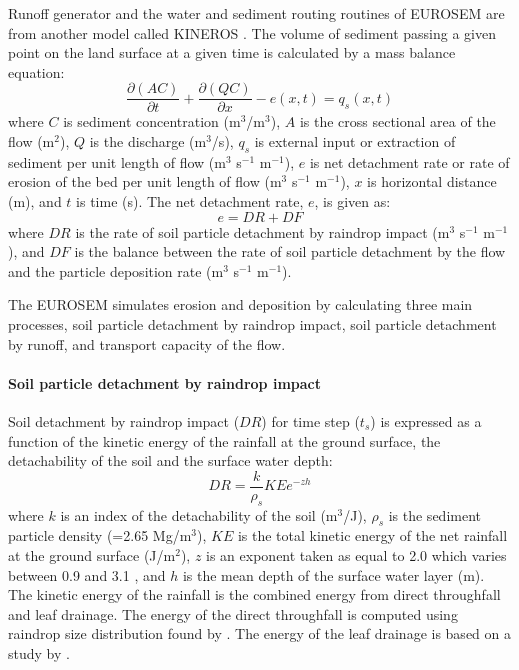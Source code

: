 Runoff generator and the water and sediment routing routines of EUROSEM are from
another model called KINEROS \citep{woolhiser1990-kineros}. The volume of
sediment passing a given point on the land surface at a given time is calculated
by a mass balance equation:
\begin{equation}
\label{eq:eurosemmassbalance}
  \frac{\partial(AC)}{\partial t}+\frac{\partial(QC)}{\partial x}-e(x,t)=
q_s(x,t)
\end{equation}
where $C$ is sediment concentration (m$^3$/m$^3$), $A$ is the cross sectional
area of the flow (m$^2$), $Q$ is the discharge (m$^3$/s), $q_s$ is external
input or extraction of sediment per unit length of flow (m$^3$ s$^{-1}$
m$^{-1}$), $e$ is net detachment rate or rate of erosion of the bed per unit
length of flow (m$^3$ s$^{-1}$ m$^{-1}$), $x$ is horizontal distance (m), and
$t$ is time (s).
The net detachment rate, $e$, is given as:
\begin{equation}
\label{eq:eurosemnetdetachmentrate}
  e = DR + DF
\end{equation}
where $DR$ is the rate of soil particle detachment by raindrop impact (m$^3$
s$^{-1}$ m$^{-1}$), and $DF$ is the balance between the rate of soil particle
detachment by the flow and the particle deposition rate (m$^3$ s$^{-1}$
m$^{-1}$).

The EUROSEM simulates erosion and deposition by calculating three main
processes, soil particle detachment by raindrop impact, soil particle detachment
by runoff, and transport capacity of the flow.

\paragraph{Soil particle detachment by raindrop impact}
\label{sec:SoilParticleDetachmentByRaindropImpact}
Soil detachment by raindrop impact ($DR$) for time step ($t_s$) is expressed as
a function of the kinetic energy of the rainfall at the ground surface, the
detachability of the soil and the surface water depth:
\begin{equation}
\label{eq:EUROSEMsoildetachmentbyraindropimpact}
  DR = \frac{k}{\rho_s} {KE} e^{-zh}
\end{equation}
where $k$ is an index of the detachability of the soil (m$^3$/J), $\rho_s$ is
the sediment particle density (=2.65 Mg/m$^3$), $KE$ is the total kinetic energy
of the net rainfall at the ground surface (J/m$^2$), $z$ is an exponent taken as
equal to 2.0 which varies between 0.9 and 3.1 \citep{torri1987-149}, and $h$ is
the mean depth of the surface water layer (m).
The kinetic energy of the rainfall is the combined energy from direct
throughfall and leaf drainage. The energy of the direct throughfall is computed
using raindrop size distribution found by \citet{marshall1948-165}. The energy
of the leaf drainage is based on a study by \citet{brandt1990-687}.

